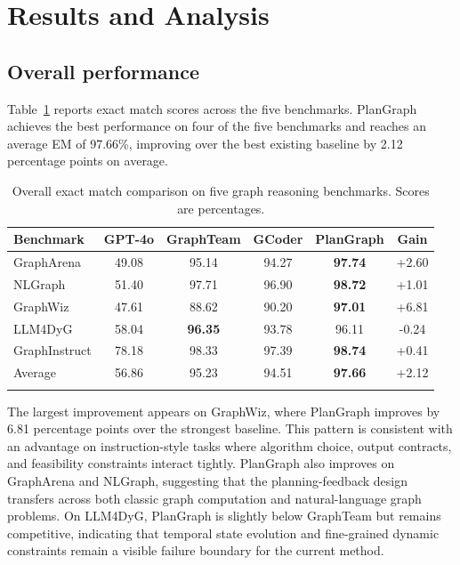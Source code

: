 \documentclass[pdflatex,sn-mathphys-num]{sn-jnl}
\theoremstyle{thmstyleone}
\theoremstyle{thmstyletwo}
\theoremstyle{thmstylethree}
\begin{document}
\section{Results and Analysis}\label{sec:results}

\subsection{Overall performance}

Table~\ref{tab:overall} reports exact match scores across the five benchmarks. PlanGraph achieves the best performance on four of the five benchmarks and reaches an average EM of 97.66\%, improving over the best existing baseline by 2.12 percentage points on average.

\begin{table}[t]
\caption{Overall exact match comparison on five graph reasoning benchmarks. Scores are percentages.}
\label{tab:overall}
\begin{tabular}{@{}lccccc@{}}
\toprule
Benchmark & GPT-4o & GraphTeam & GCoder & PlanGraph & Gain \\
\midrule
GraphArena & 49.08 & 95.14 & 94.27 & \textbf{97.74} & +2.60 \\
NLGraph & 51.40 & 97.71 & 96.90 & \textbf{98.72} & +1.01 \\
GraphWiz & 47.61 & 88.62 & 90.20 & \textbf{97.01} & +6.81 \\
LLM4DyG & 58.04 & \textbf{96.35} & 93.78 & 96.11 & -0.24 \\
GraphInstruct & 78.18 & 98.33 & 97.39 & \textbf{98.74} & +0.41 \\
\midrule
Average & 56.86 & 95.23 & 94.51 & \textbf{97.66} & +2.12 \\
\botrule
\end{tabular}
\end{table}

The largest improvement appears on GraphWiz, where PlanGraph improves by 6.81 percentage points over the strongest baseline. This pattern is consistent with an advantage on instruction-style tasks where algorithm choice, output contracts, and feasibility constraints interact tightly. PlanGraph also improves on GraphArena and NLGraph, suggesting that the planning-feedback design transfers across both classic graph computation and natural-language graph problems. On LLM4DyG, PlanGraph is slightly below GraphTeam but remains competitive, indicating that temporal state evolution and fine-grained dynamic constraints remain a visible failure boundary for the current method.
\end{document}
